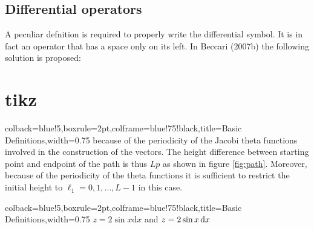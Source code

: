 {\subsection{Differential operators}
A peculiar defnition is required to properly
write the differential symbol. It is in fact an operator that has a space only on its left. In Beccari (2007b) the following solution is proposed:

\bigskip


\clearpage
\section{tikz}
\begin{tcblisting}{colback=blue!5,boxrule=2pt,colframe=blue!75!black,title=Basic Definitions,width=0.75\textwidth}
because of the periodicity of the Jacobi theta functions involved in the construction of the vectors.
The height difference between starting point and endpoint of the path is thus $Lp$ as shown in figure \ref{fig:path}. Moreover, because of the periodicity of the theta functions it is sufficient to restrict the initial height to $\ell_1=0,1,\dots,L-1$ in this case.
  \centering
\end{tcblisting}
\clearpage


\begin{tcblisting}{colback=blue!5,boxrule=2pt,colframe=blue!75!black,title=Basic Definitions,width=0.75\textwidth}
\newcommand{\ud}{\ensuremath \mathop{}\!\mathrm{d}}
\(z=2\sin x\mathrm{d}x\) and \(z=2\sin x\ud x\)
\end{tcblisting}
\newcommand{\ud}{\mathop{}\!\mathrm{d}}
\bigskip

}
